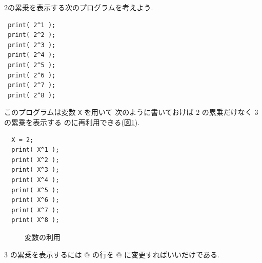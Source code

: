 \documentclass{jbook}
\begin{document}
$2$の累乗を表示する次のプログラムを考えよう.
\begin{screen}
\begin{verbatim}
 print( 2^1 );
 print( 2^2 );
 print( 2^3 );
 print( 2^4 );
 print( 2^5 );
 print( 2^6 );
 print( 2^7 );
 print( 2^8 );
\end{verbatim}
\end{screen}
このプログラムは変数 {\tt X} を用いて
次のように書いておけば $2$ の累乗だけなく $3$ の累乗を表示する
のに再利用できる(図\ref{fig:powerOf2}).
\begin{screen}
\begin{verbatim}
  X = 2;
  print( X^1 );
  print( X^2 );
  print( X^3 );
  print( X^4 );
  print( X^5 );
  print( X^6 );
  print( X^7 );
  print( X^8 );
\end{verbatim}
\end{screen}
\begin{figure}[thb]
\begin{center}
\end{center}
\caption{変数の利用} \label{fig:powerOf2}
\end{figure}
$3$ の累乗を表示するには
@ の行を @ に変更すればいいだけである.
\end{document}
